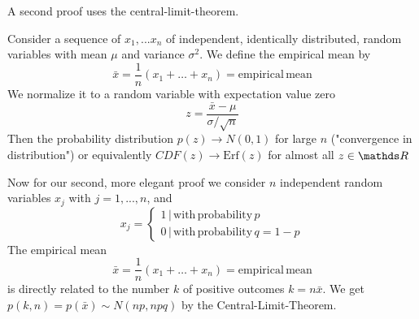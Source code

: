 \documentclass{notebook}
\begin{document}
A second proof uses the central-limit-theorem.

\begin{theorem}
	Consider a sequence of $x_1, ... x_n$ of independent, identically distributed, random variables with mean $\mu$ and variance $\sigma^2$. We define the empirical mean by
	\begin{equation}
	\bar{x} = \frac{1}{n}(x_1 + \dots + x_n) = \mathrm{empirical \, mean}
	\end{equation}
	We normalize it to a random variable with expectation value zero
	\begin{equation}
	z = \frac{\bar{x}-\mu}{\sigma/\sqrt{n}}
	\end{equation}
	Then the probability distribution $p(z) \to N(0,1)$ for large $n$ ("convergence in distribution") or equivalently $CDF(z) \to \mathrm{Erf}(z)$ for almost all $z \in \R$	
\end{theorem}

Now for our second, more elegant proof we consider $n$ independent random variables $x_j$ with $j = 1,...,n$, and
%
\begin{equation}
x_j = \begin{cases} 1 \, | \, \mathrm{with \, probability \,} p \\ 0 \, | \, \mathrm{with \, probability \, } q = 1 - p \end{cases}
\end{equation}
%
The empirical mean
%
\begin{equation}
\bar{x} = \frac{1}{n}(x_1 + \dots + x_n) = \mathrm{empirical \, mean}
\end{equation}
%
is directly related to the number $k$ of positive outcomes $k = n\bar{x}$. We get $p(k,n) = p(\bar{x}) \sim N(np,npq)$ by the Central-Limit-Theorem. 
\end{document}
